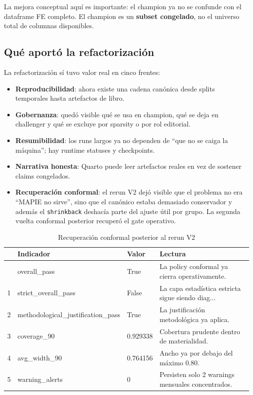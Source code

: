 \documentclass[
  spanish,
  11pt,
  letterpaper,
]{scrbook}
\providecommand{\tightlist}{%
  \setlength{\itemsep}{0pt}\setlength{\parskip}{0pt}}
\theoremstyle{plain}
\theoremstyle{remark}
\begin{document}
La mejora conceptual aquí es importante: el champion ya no se confunde
con el dataframe FE completo. El champion es un \textbf{subset
congelado}, no el universo total de columnas disponibles.

\subsection{Qué aportó la
refactorización}\label{quuxe9-aportuxf3-la-refactorizaciuxf3n}

La refactorización sí tuvo valor real en cinco frentes:

\begin{itemize}
\tightlist
\item
  \textbf{Reproducibilidad}: ahora existe una cadena canónica desde
  splits temporales hasta artefactos de libro.
\item
  \textbf{Gobernanza}: quedó visible qué se usa en champion, qué se deja
  en challenger y qué se excluye por sparsity o por rol editorial.
\item
  \textbf{Resumibilidad}: los runs largos ya no dependen de ``que no se
  caiga la máquina''; hay runtime statuses y checkpoints.
\item
  \textbf{Narrativa honesta}: Quarto puede leer artefactos reales en vez
  de sostener claims congelados.
\item
  \textbf{Recuperación conformal}: el rerun V2 dejó visible que el
  problema no era ``MAPIE no sirve'', sino que el canónico estaba
  demasiado conservador y además el \texttt{shrinkback} deshacía parte
  del ajuste útil por grupo. La segunda vuelta conformal posterior
  recuperó el gate operativo.
\end{itemize}

{

\begin{longtable}[]{@{}llll@{}}

\caption{\label{tbl-rerun-v2-conformal-recovery}Recuperación conformal
posterior al rerun V2}

\tabularnewline

\toprule\noalign{}
& Indicador & Valor & Lectura \\
\midrule\noalign{}
\endhead
\bottomrule\noalign{}
\endlastfoot
0 & overall\_pass & True & La policy conformal ya cierra
operativamente. \\
1 & strict\_overall\_pass & False & La capa estadística estricta sigue
siendo diag... \\
2 & methodological\_justification\_pass & True & La justificación
metodológica ya aplica. \\
3 & coverage\_90 & 0.929338 & Cobertura prudente dentro de
materialidad. \\
4 & avg\_width\_90 & 0.764156 & Ancho ya por debajo del máximo 0.80. \\
5 & warning\_alerts & 0 & Persisten solo 2 warnings mensuales
concentrados. \\

\end{longtable}

}
\end{document}
